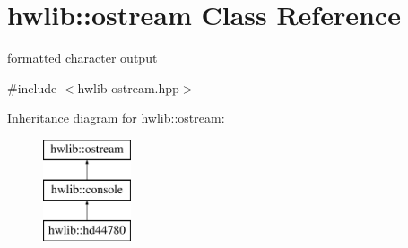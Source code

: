 \hypertarget{classhwlib_1_1ostream}{}\section{hwlib\+:\+:ostream Class Reference}
\label{classhwlib_1_1ostream}


formatted character output  




{\ttfamily \#include $<$hwlib-\/ostream.\+hpp$>$}

Inheritance diagram for hwlib\+:\+:ostream\+:\begin{figure}[H]
\begin{center}
\leavevmode
\includegraphics[height=3.000000cm]{classhwlib_1_1ostream}
\end{center}
\end{figure}
